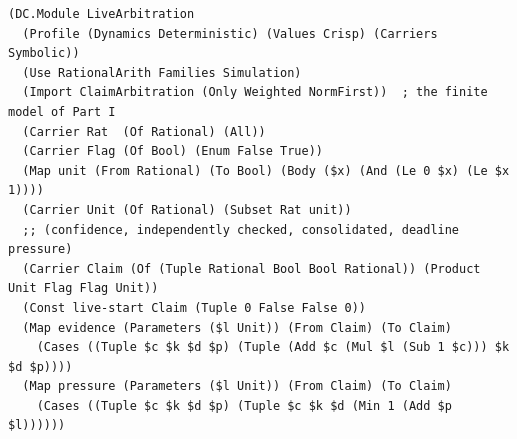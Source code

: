 \documentclass[11pt]{article}
\theoremstyle{definition}
\theoremstyle{plain}
\begin{document}
\begin{lstlisting}[style=mettamod]
(DC.Module LiveArbitration
  (Profile (Dynamics Deterministic) (Values Crisp) (Carriers Symbolic))
  (Use RationalArith Families Simulation)
  (Import ClaimArbitration (Only Weighted NormFirst))  ; the finite model of Part I
  (Carrier Rat  (Of Rational) (All))
  (Carrier Flag (Of Bool) (Enum False True))
  (Map unit (From Rational) (To Bool) (Body ($x) (And (Le 0 $x) (Le $x 1))))
  (Carrier Unit (Of Rational) (Subset Rat unit))
  ;; (confidence, independently checked, consolidated, deadline pressure)
  (Carrier Claim (Of (Tuple Rational Bool Bool Rational)) (Product Unit Flag Flag Unit))
  (Const live-start Claim (Tuple 0 False False 0))
  (Map evidence (Parameters ($l Unit)) (From Claim) (To Claim)
    (Cases ((Tuple $c $k $d $p) (Tuple (Add $c (Mul $l (Sub 1 $c))) $k $d $p))))
  (Map pressure (Parameters ($l Unit)) (From Claim) (To Claim)
    (Cases ((Tuple $c $k $d $p) (Tuple $c $k $d (Min 1 (Add $p $l))))))


\end{lstlisting}
\end{document}
